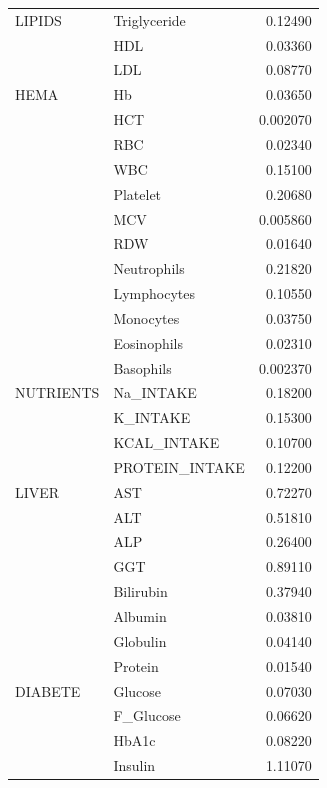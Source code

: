 \begin{center}
\begin{longtable}{llr}
\hline
LIPIDS      & Triglyceride       & 0.12490  \\
            & HDL                & 0.03360  \\
            & LDL                & 0.08770  \\
\hline
HEMA        & Hb                 & 0.03650  \\
            & HCT                & 0.002070 \\
            & RBC                & 0.02340  \\
            & WBC                & 0.15100  \\
            & Platelet           & 0.20680  \\
            & MCV                & 0.005860 \\
            & RDW                & 0.01640  \\
            & Neutrophils        & 0.21820  \\
            & Lymphocytes        & 0.10550  \\
            & Monocytes          & 0.03750  \\
            & Eosinophils        & 0.02310  \\
            & Basophils          & 0.002370 \\
\hline
NUTRIENTS   & Na\_INTAKE         & 0.18200  \\
            & K\_INTAKE          & 0.15300  \\
            & KCAL\_INTAKE       & 0.10700  \\
            & PROTEIN\_INTAKE    & 0.12200  \\
\hline
LIVER       & AST                & 0.72270  \\
            & ALT                & 0.51810  \\
            & ALP                & 0.26400  \\
            & GGT                & 0.89110  \\
            & Bilirubin          & 0.37940  \\
            & Albumin            & 0.03810  \\
            & Globulin           & 0.04140  \\
            & Protein            & 0.01540  \\
\hline
DIABETE     & Glucose            & 0.07030  \\
            & F\_Glucose         & 0.06620  \\
            & HbA1c              & 0.08220  \\
            & Insulin            & 1.11070  \\
\hline
\end{longtable}
\end{center}

